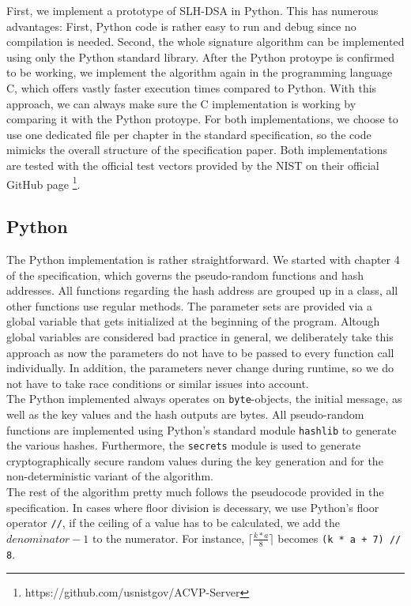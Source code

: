 \documentclass[journal=tosc,notanonymous]{iacrtrans}
\begin{document}
First, we implement a prototype of SLH-DSA in Python.
This has numerous advantages: First, Python code is rather easy to run and debug since no compilation is needed.
Second, the whole signature algorithm can be implemented using only the Python standard library.
After the Python protoype is confirmed to be working, we implement the algorithm again in the programming language C, which offers vastly faster execution times compared to Python.
With this approach, we can always make sure the C implementation is working by comparing it with the Python protoype.
For both implementations, we choose to use one dedicated file per chapter in the standard specification, so the code mimicks the overall structure of the specification paper.
Both implementations are tested with the official test vectors provided by the NIST on their official GitHub page \footnote{https://github.com/usnistgov/ACVP-Server}.


\subsection{Python}

The Python implementation is rather straightforward.
We started with chapter 4 of the specification, which governs the pseudo-random functions and hash addresses.
All functions regarding the hash address are grouped up in a class, all other functions use regular methods.
The parameter sets are provided via a global variable that gets initialized at the beginning of the program.
Altough global variables are considered bad practice in general, we deliberately take this approach as now the parameters do not have to be passed to every function call individually.
In addition, the parameters never change during runtime, so we do not have to take race conditions or similar issues into account.
\\
The Python implemented always operates on \texttt{byte}-objects, the initial message, as well as the key values and the hash outputs are bytes.
All pseudo-random functions are implemented using Python's standard module \texttt{hashlib} to generate the various hashes.
Furthermore, the \texttt{secrets} module is used to generate cryptographically secure random values during the key generation and for the non-deterministic variant of the algorithm.
\\
The rest of the algorithm pretty much follows the pseudocode provided in the specification.
In cases where floor division is decessary, we use Python's floor operator \texttt{//}, if the ceiling of a value has to be calculated, we add the $denominator - 1$ to the numerator.
For instance, $\lceil \frac{k * a}{8} \rceil$ becomes \texttt{(k * a + 7) // 8}.
\end{document}
